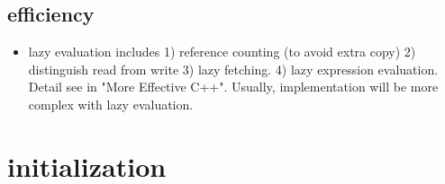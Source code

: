 \documentclass[a4paper,12pt,twoside]{book}
\begin{document}
\subsection{efficiency}
\begin{itemize}
\item  lazy evaluation includes 1) reference counting (to avoid extra copy) 2) distinguish read from write 3) lazy fetching. 4) lazy expression evaluation. Detail see in "More Effective C++". Usually, implementation will be  more complex with lazy evaluation.

\end{itemize}


\section{initialization}
\end{document}
